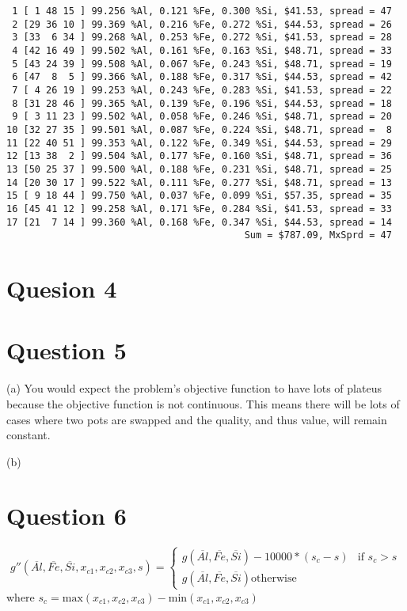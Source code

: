 \documentclass{article}
\begin{document}
\begin{verbatim}
 1 [ 1 48 15 ] 99.256 %Al, 0.121 %Fe, 0.300 %Si, $41.53, spread = 47
 2 [29 36 10 ] 99.369 %Al, 0.216 %Fe, 0.272 %Si, $44.53, spread = 26
 3 [33  6 34 ] 99.268 %Al, 0.253 %Fe, 0.272 %Si, $41.53, spread = 28
 4 [42 16 49 ] 99.502 %Al, 0.161 %Fe, 0.163 %Si, $48.71, spread = 33
 5 [43 24 39 ] 99.508 %Al, 0.067 %Fe, 0.243 %Si, $48.71, spread = 19
 6 [47  8  5 ] 99.366 %Al, 0.188 %Fe, 0.317 %Si, $44.53, spread = 42
 7 [ 4 26 19 ] 99.253 %Al, 0.243 %Fe, 0.283 %Si, $41.53, spread = 22
 8 [31 28 46 ] 99.365 %Al, 0.139 %Fe, 0.196 %Si, $44.53, spread = 18
 9 [ 3 11 23 ] 99.502 %Al, 0.058 %Fe, 0.246 %Si, $48.71, spread = 20
10 [32 27 35 ] 99.501 %Al, 0.087 %Fe, 0.224 %Si, $48.71, spread =  8
11 [22 40 51 ] 99.353 %Al, 0.122 %Fe, 0.349 %Si, $44.53, spread = 29
12 [13 38  2 ] 99.504 %Al, 0.177 %Fe, 0.160 %Si, $48.71, spread = 36
13 [50 25 37 ] 99.500 %Al, 0.188 %Fe, 0.231 %Si, $48.71, spread = 25
14 [20 30 17 ] 99.522 %Al, 0.111 %Fe, 0.277 %Si, $48.71, spread = 13
15 [ 9 18 44 ] 99.750 %Al, 0.037 %Fe, 0.099 %Si, $57.35, spread = 35
16 [45 41 12 ] 99.258 %Al, 0.171 %Fe, 0.284 %Si, $41.53, spread = 33
17 [21  7 14 ] 99.360 %Al, 0.168 %Fe, 0.347 %Si, $44.53, spread = 14
                                          Sum = $787.09, MxSprd = 47
\end{verbatim}

\section{Quesion 4}

\section{Question 5}
(a) You would expect the problem's objective function to have lots of 
plateus because the objective function is not continuous. This means
there will be lots of cases where two pots are swapped and the
quality, and thus value, will remain constant.

(b) 

\section{Question 6}
$$g''(\overline{Al}, \overline{Fe}, \overline{Si}, x_{c1}, x_{c2}, 
x_{c3}, s) =
\begin{cases}
    g(\overline{Al}, \overline{Fe}, \overline{Si}) - 10000*(s_c - s) & \text{if } s_c > s \\
    g(\overline{Al}, \overline{Fe}, \overline{Si}) \text{otherwise}
\end{cases}$$ where
$s_c = \text{max}(x_{c1}, x_{c2}, x_{c3}) - \text{min}(x_{c1}, x_{c2}, x_{c3})$
\end{document}
